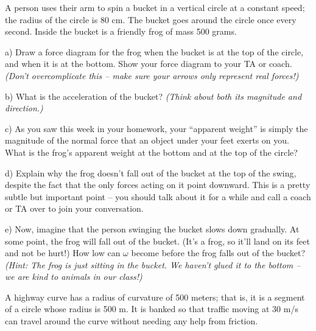 \documentclass[12pt]{article}
\begin{document}
\Large
\centerline{}
\normalsize
\centerline{}






A person uses their arm to spin a bucket in a vertical circle at a constant speed; the radius of the circle is 80 cm. The bucket goes around the circle once every second. Inside the bucket is a friendly frog of mass 500 grams. 


a) Draw a force diagram for the frog when the bucket is at the top of the circle, and when it is at the bottom. Show your force diagram to your TA or coach. {\it (Don't overcomplicate this -- make sure your arrows only represent real forces!)}

\vspace{2in}

b) What is the acceleration of the bucket? {\it (Think about both its magnitude and direction.)}

\vspace{1in}


c) As you saw this week in your homework, your ``apparent weight'' is simply the magnitude of the normal force that an object under your feet exerts on you. What is the frog's apparent weight at the bottom and at the top of the circle?

\vspace{2in}
\newpage
d) Explain why the frog doesn't fall out of the bucket at the top of the swing, despite the fact that the only forces acting on it point downward. This is a pretty subtle but important point -- you should talk about it for a while and call a coach or TA over to join your conversation.

\vspace{4in}

e) Now, imagine that the person swinging the bucket slows down gradually. At some point, the frog will fall out of the bucket. (It's a frog, so it'll land on its feet and not be hurt!) How low can $\omega$ become before the frog falls out of the bucket? {\it (Hint: The frog is just sitting in the bucket. We haven't glued it to the bottom -- we are kind to animals in our class!)}

\newpage


A highway curve has a radius of curvature of 500 meters; that is, it is a segment of a circle whose radius is 500 m. It is banked so that traffic moving at 30 m/s can travel
around the curve without needing any help from friction.
\end{document}
